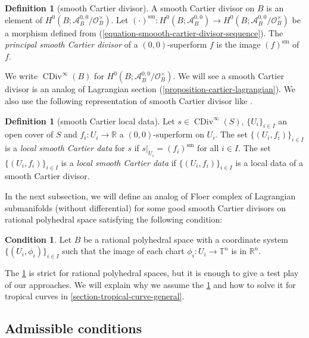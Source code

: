 \documentclass[a4paper,dvipdfmx,reqno,12pt]{amsart}
\theoremstyle{definition}
\newtheorem{definition}[theorem]{Definition}
\newtheorem{condition}[theorem]{Condition}
\newcommand{\opn}[1]{\operatorname{#1}}
\numberwithin{equation}{section}
\begin{document}
\begin{definition}[{smooth Cartier divisor}]
A smooth Cartier divisor on $B$ is an element of
$H^{0}(B;\mathcal{A}^{0,0}_{B}/\mathcal{O}^{\times}_B)$.
Let 
$(\cdot)^{\mathrm{sm}}\colon 
H^{0}(B;\mathcal{A}^{0,0}_B)\to 
H^{0}(B;\mathcal{A}^{0,0}_{B}/\mathcal{O}^{\times}_B)$ 
be a morphism defined from 
(\ref{equation-smoooth-cartier-divisor-sequence}).
The \emph{principal smooth Cartier divisor} of a $(0,0)$-superform 
$f$ is the image $(f)^{\mathrm{sm}}$ of $f$.
\end{definition}
We write $\opn{CDiv}^{\infty}(B)$ for 
$H^{0}(B;\mathcal{A}^{0,0}_{B}/\mathcal{O}^{\times}_B)$.
We will see a smooth Cartier divisor is
an analog of Lagrangian section 
(\cref{proposition-cartier-lagrangian}).
We also use the following representation of 
smooth Cartier divisor like 
\cite[Definition 4.0.12]{MR2810322}.
\begin{definition}[{smooth Cartier local data}]
Let $s\in \opn{CDiv}^{\infty}(S)$, 
$\{U_i\}_{i\in I}$ an open cover of $S$ and 
$f_i\colon U_i \to \mathbb{R}$ a $(0,0)$-superform
on $U_i$. The set 
$\{(U_i,f_i)\}_{i\in I}$ is 
a \emph{local smooth Cartier data} for $s$ if 
$s|_{U_i}=(f_i)^{\mathrm{sm}}$ for all 
$i\in I$. The set $\{(U_i,f_i)\}_{i\in I}$ is a
\emph{local smooth Cartier data} if 
$\{(U_i,f_i)\}_{i\in I}$ is a local data of a smooth
Cartier divisor.
\end{definition}


In the next subsection, 
we will define an analog of Floer complex of 
Lagrangian submanifolds
(without differential) for some good smooth Cartier 
divisors on rational polyhedral space satisfying 
the following condition:

\begin{condition}
\label{condition-Rn}
Let $B$ be a rational polyhedral space with 
a coordinate system $\{(U_i,\phi_i)\}_{i\in I}$
such that the image of each chart 
$\phi_i\colon U_i \to \mathbb{T}^{n}$
is in $\mathbb{R}^{n}$.
\end{condition}

The \cref{condition-Rn} is strict for rational polyhedral
spaces, but it is enough to
give a test play of our approaches.
We will explain why we assume the \cref{condition-Rn}
and how to solve it
for tropical curves in 
\cref{section-tropical-curve-general}.

\subsection{Admissible conditions}
\end{document}
